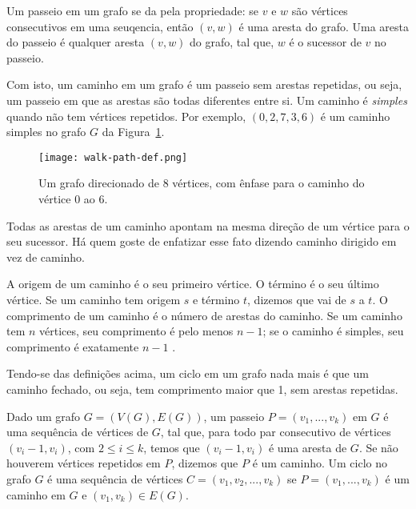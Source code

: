 Um passeio em um grafo se da pela propriedade: se $v$ e $w$ são vértices consecutivos em uma seuqencia, então $(v, w)$ é uma aresta do grafo. Uma aresta do passeio é qualquer aresta $(v, w)$ do grafo, tal que, $w$ é o sucessor de $v$ no passeio.

Com isto, um caminho em um grafo é um passeio sem arestas repetidas, ou seja, um passeio em que as arestas são todas diferentes entre si. Um caminho é \emph{simples} quando não tem vértices repetidos. Por exemplo, $(0, 2, 7, 3, 6)$ é um caminho simples no grafo $G$ da Figura~\ref{sec2:walk-path-def}.

\begin{figure}
    \centering
    \texttt{[image: walk-path-def.png]}
    \caption{Um grafo direcionado de 8 vértices, com ênfase para o caminho do vértice 0 ao 6.}
    \label{sec2:walk-path-def}
\end{figure}

Todas as arestas de um caminho apontam na mesma direção de um vértice para o seu sucessor. Há quem goste de enfatizar esse fato dizendo caminho dirigido em vez de caminho.

A origem de um caminho é o seu primeiro vértice. O término é o seu último vértice. Se um caminho tem origem $s$ e término $t$, dizemos que vai de $s$ a $t$. O comprimento de um caminho é o número de arestas do caminho. Se um caminho tem $n$ vértices, seu comprimento é pelo menos \begin{math}n - 1\end{math}; se o caminho é simples, seu comprimento é exatamente \begin{math}n - 1\end{math} \cite{feofiloff2018}.

Tendo-se das definições acima, um ciclo em um grafo nada mais é que um caminho fechado, ou seja, tem comprimento maior que 1, sem arestas repetidas.

\begin{definition}
    Dado um grafo $G = (V(G), E(G))$, um passeio $P = (v_1, ..., v_k)$ em $G$ é uma sequência de vértices de $G$, tal que, para todo par consecutivo de vértices $(v_i - 1, v_i)$, com $2 \leq i \leq k$, temos que $(v_i - 1, v_i)$ é uma aresta de $G$. Se não houverem vértices repetidos em $P$, dizemos que $P$  é um caminho. Um ciclo no grafo $G$ é uma sequência de vértices $C = (v_1,v_2,...,v_k)$ se $P = (v_1, ..., v_k)$ é um caminho em $G$ e $(v_1, v_k) \in E(G)$.
\end{definition}

